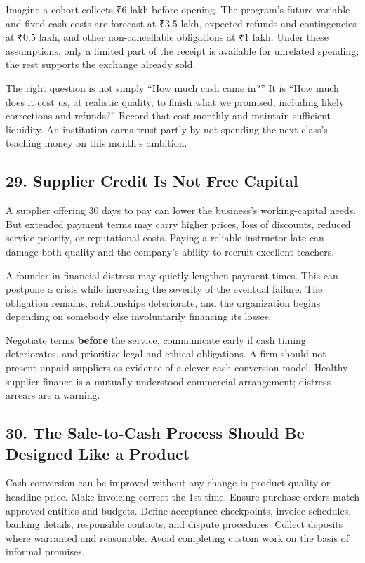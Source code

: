 Imagine a cohort collects ₹6 lakh before opening. The program's future variable and fixed cash costs are forecast at ₹3.5 lakh, expected refunds and contingencies at ₹0.5 lakh, and other non-cancellable obligations at ₹1 lakh. Under these assumptions, only a limited part of the receipt is available for unrelated spending; the rest supports the exchange already sold.

The right question is not simply ``How much cash came in?'' It is ``How much does it cost us, at realistic quality, to finish what we promised, including likely corrections and refunds?'' Record that cost monthly and maintain sufficient liquidity. An institution earns trust partly by not spending the next class's teaching money on this month's ambition.

\subsection*{29. Supplier Credit Is Not Free Capital}

A supplier offering 30 days to pay can lower the business's working-capital needs. But extended payment terms may carry higher prices, loss of discounts, reduced service priority, or reputational costs. Paying a reliable instructor late can damage both quality and the company's ability to recruit excellent teachers.

A founder in financial distress may quietly lengthen payment times. This can postpone a crisis while increasing the severity of the eventual failure. The obligation remains, relationships deteriorate, and the organization begins depending on somebody else involuntarily financing its losses.

Negotiate terms \textbf{before} the service, communicate early if cash timing deteriorates, and prioritize legal and ethical obligations. A firm should not present unpaid suppliers as evidence of a clever cash-conversion model. Healthy supplier finance is a mutually understood commercial arrangement; distress arrears are a warning.

\subsection*{30. The Sale-to-Cash Process Should Be Designed Like a Product}

Cash conversion can be improved without any change in product quality or headline price. Make invoicing correct the 1st time. Ensure purchase orders match approved entities and budgets. Define acceptance checkpoints, invoice schedules, banking details, responsible contacts, and dispute procedures. Collect deposits where warranted and reasonable. Avoid completing custom work on the basis of informal promises.

